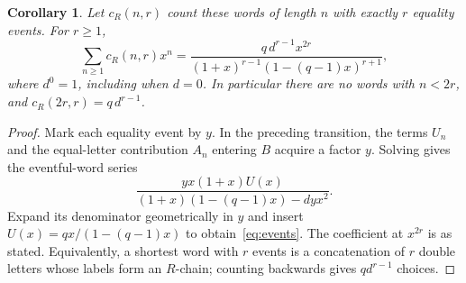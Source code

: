 \documentclass[11pt]{article}
\newtheorem{corollary}[theorem]{Corollary}
\begin{document}
\begin{corollary}\label{cor:events}
Let $c_R(n,r)$ count these words of length $n$ with exactly $r$ equality
events. For $r\geq1$,
\begin{equation}\label{eq:events}
 \sum_{n\geq1}c_R(n,r)x^n=
 \frac{q\,d^{r-1}x^{2r}}
 {(1+x)^{r-1}(1-(q-1)x)^{r+1}},
\end{equation}
where $d^0=1$, including when $d=0$. In particular there are no words
with $n<2r$, and $c_R(2r,r)=q\,d^{r-1}$.
\end{corollary}
\begin{proof}
Mark each equality event by $y$. In the preceding transition, the terms
$U_n$ and the equal-letter contribution $A_n$ entering $B$ acquire a
factor $y$. Solving gives the eventful-word series
\[
 \frac{y x(1+x)U(x)}{(1+x)(1-(q-1)x)-dyx^2}.
\]
Expand its denominator geometrically in $y$ and insert
$U(x)=qx/(1-(q-1)x)$ to obtain~\eqref{eq:events}.
The coefficient at $x^{2r}$ is as stated. Equivalently, a shortest word
with $r$ events is a concatenation of $r$ double letters whose labels
form an $R$-chain; counting backwards gives $q d^{r-1}$ choices.
\end{proof}
\end{document}
